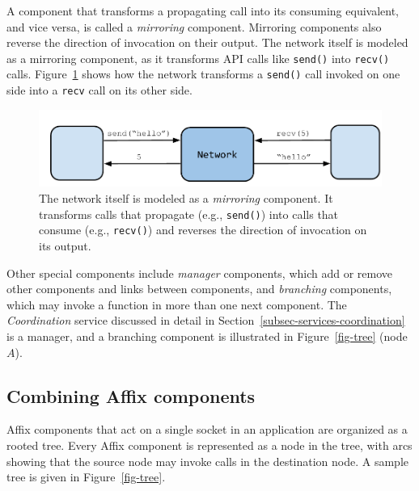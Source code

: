 A component that transforms a propagating 
call into its consuming equivalent, and vice versa,
is called a \textit{mirroring} component. 
Mirroring components also reverse the direction 
of invocation on their output.
The network itself is modeled as a mirroring component, 
as it transforms API calls like \texttt{send()}  
into \texttt{recv()} calls. Figure~\ref{fig-mirroring}
shows how the network transforms a \texttt{send()}
call invoked on one side into a 
\texttt{recv} call on its other side.

\begin{figure}[htb]
  \centering
  \includegraphics[width=\linewidth]{figs/network.pdf} 
  \caption{The network itself is modeled as a
  \textit{mirroring} component. It transforms calls 
  that propagate (e.g., \texttt{send()}) into 
  calls that consume (e.g., \texttt{recv()}) and 
  reverses the direction of invocation on its output. }
  \label{fig-mirroring}
\end{figure}


Other special components include \textit{manager}
components, which add or remove other components 
and links between components, and
\textit{branching} components, which may invoke 
a function in more than one next component.  
The \textit{Coordination} service discussed 
in detail in Section~\ref{subsec-services-coordination} is a manager, 
and a branching component is illustrated 
in Figure~\ref{fig-tree} (node $A$).


\subsection{Combining Affix components}
\label{subsec-arch-stack}



Affix components that act on a single socket
in an application
are organized as a rooted tree.
Every Affix component is represented as a 
node in the tree, with arcs showing that 
the source node may invoke calls in the destination node.
A sample tree is given
in Figure~\ref{fig-tree}.

